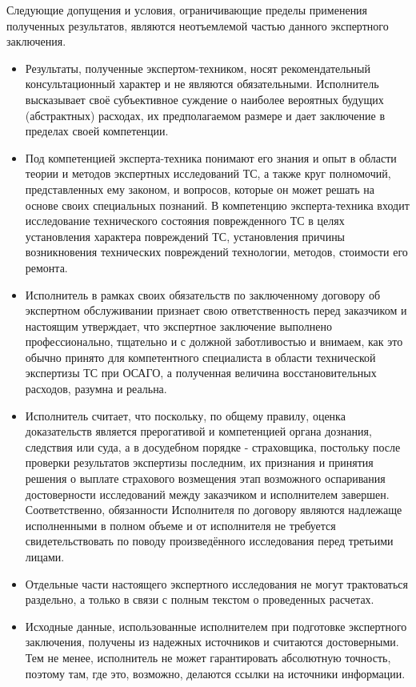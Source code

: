 Следующие допущения и условия, ограничивающие пределы применения полученных результатов, являются неотъемлемой частью данного экспертного заключения.
\begin{itemize}
\item  {Результаты, полученные экспертом-техником, носят рекомендательный консультационный характер и не являются обязательными. Исполнитель высказывает своё субъективное суждение о наиболее вероятных будущих (абстрактных) расходах, их предполагаемом размере и дает заключение в пределах своей компетенции.}
\item { Под компетенцией эксперта-техника понимают его знания и опыт в области теории и методов экспертных исследований ТС, а также круг полномочий, представленных ему законом, и вопросов, которые он может решать на основе своих специальных познаний.
В компетенцию эксперта-техника входит исследование технического состояния поврежденного ТС в целях установления характера повреждений ТС, установления причины возникновения технических повреждений технологии, методов, стоимости его ремонта.}
\item  {Исполнитель в рамках своих обязательств по заключенному договору об экспертном обслуживании признает свою ответственность перед заказчиком и настоящим утверждает, что экспертное заключение выполнено профессионально, тщательно и с должной заботливостью и внимаем, как это обычно принято для компетентного специалиста в области технической экспертизы ТС при ОСАГО, а полученная величина восстановительных расходов, разумна и реальна.}
\item  {Исполнитель считает, что поскольку, по общему правилу, оценка доказательств является прерогативой и компетенцией органа дознания, следствия или суда, а в досудебном порядке - страховщика, постольку после проверки результатов экспертизы последним, их признания и принятия решения о выплате страхового возмещения этап возможного оспаривания достоверности исследований между заказчиком и исполнителем завершен.
Соответственно, обязанности Исполнителя по договору являются надлежаще исполненными в полном объеме и от исполнителя не требуется свидетельствовать по поводу произведённого исследования перед третьими лицами.}
\item  {Отдельные части настоящего экспертного исследования не могут трактоваться раздельно, а только в связи с полным текстом о проведенных расчетах.}
\item  {Исходные данные, использованные исполнителем при подготовке экспертного заключения, получены из надежных источников и считаются достоверными. Тем не менее, исполнитель не может гарантировать абсолютную точность, поэтому там, где это, возможно, делаются ссылки на источники информации.}

\end{itemize}
